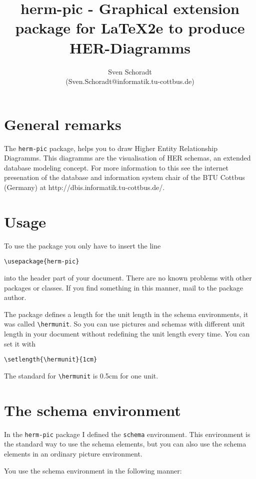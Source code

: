 \documentclass[a4paper,11pt]{article}
\author{Sven Schoradt \\ (Sven.Schoradt@informatik.tu-cottbus.de)}
\title{herm-pic - Graphical extension package for LaTeX2e to produce HER-Diagramms}
\begin{document}
\maketitle

\section{General remarks}

The {\tt herm-pic} package, helps you to draw Higher Entity Relationship Diagramms.
This diagramms are the visualisation of HER schemas, an extended database modeling 
concept. For more information to this see the internet presenation of the
database and information system chair of the BTU Cottbus (Germany)
at http://dbis.informatik.tu-cottbus.de/.

\section{Usage}

To use the package you only have to insert the line

\begin{verbatim}
\usepackage{herm-pic}
\end{verbatim}

into the header part of your document. There are no known problems with other
packages or classes. If you find something in this manner, mail to the package 
author.

The package defines a length for the unit length in the schema environments, it was called
\verb|\hermunit|. So you can use pictures and schemas with different unit length in your 
document without redefining the unit length every time. You can set it with
\begin{verbatim}
\setlength{\hermunit}{1cm}
\end{verbatim}
The standard for \verb|\hermunit| is 0.5cm for one unit.

\section{The schema environment}

In the {\tt herm-pic} package I defined the {\tt schema} environment.
This environment is the standard way to use the schema elements, but you 
can also use the schema elements in an ordinary picture environment.

You use the schema environment in the following manner:
\end{document}
